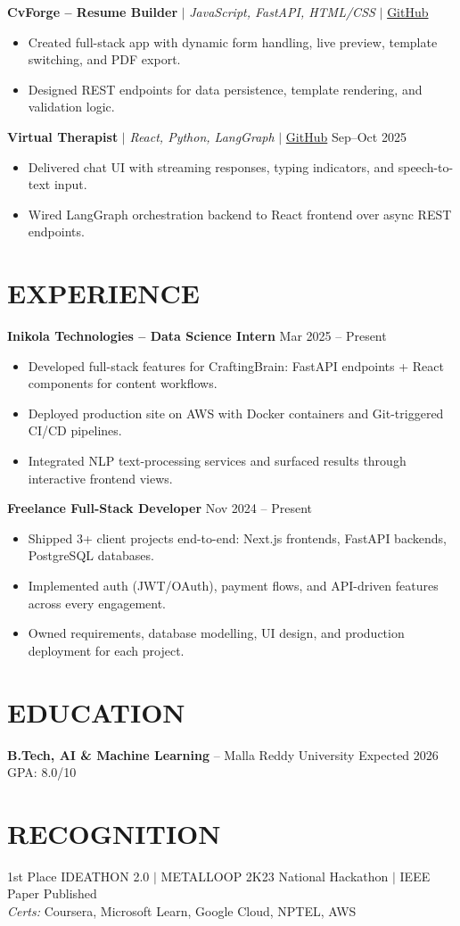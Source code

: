 \documentclass[10pt]{article}
\begin{document}
\textbf{CvForge -- Resume Builder} $|$ \textit{JavaScript, FastAPI, HTML/CSS} $|$ \href{https://github.com/JeetInTech/CvForge-Online}{GitHub}
\begin{itemize}
\item Created full-stack app with dynamic form handling, live preview, template switching, and PDF export.
\item Designed REST endpoints for data persistence, template rendering, and validation logic.
\end{itemize}

\textbf{Virtual Therapist} $|$ \textit{React, Python, LangGraph} $|$ \href{https://github.com/JeetInTech/Virtual-Therapist---LangGraph-Agentic-AI-System}{GitHub} \hfill Sep--Oct 2025
\begin{itemize}
\item Delivered chat UI with streaming responses, typing indicators, and speech-to-text input.
\item Wired LangGraph orchestration backend to React frontend over async REST endpoints.
\end{itemize}

\section*{EXPERIENCE}
\textbf{Inikola Technologies -- Data Science Intern} \hfill Mar 2025 -- Present
\begin{itemize}
\item Developed full-stack features for CraftingBrain: FastAPI endpoints + React components for content workflows.
\item Deployed production site on AWS with Docker containers and Git-triggered CI/CD pipelines.
\item Integrated NLP text-processing services and surfaced results through interactive frontend views.
\end{itemize}

\textbf{Freelance Full-Stack Developer} \hfill Nov 2024 -- Present
\begin{itemize}
\item Shipped 3+ client projects end-to-end: Next.js frontends, FastAPI backends, PostgreSQL databases.
\item Implemented auth (JWT/OAuth), payment flows, and API-driven features across every engagement.
\item Owned requirements, database modelling, UI design, and production deployment for each project.
\end{itemize}

\section*{EDUCATION}
\textbf{B.Tech, AI \& Machine Learning} -- Malla Reddy University \hfill Expected 2026 \hfill GPA: 8.0/10

\section*{RECOGNITION}
1st Place IDEATHON 2.0 $|$ METALLOOP 2K23 National Hackathon $|$ IEEE Paper Published \\
\textit{Certs:} Coursera, Microsoft Learn, Google Cloud, NPTEL, AWS
\end{document}
